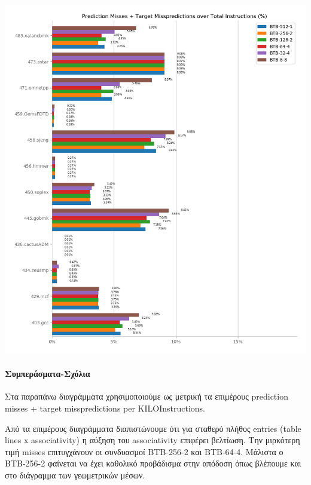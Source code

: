    \begin{minipage}{\textwidth}
      \begin{center}
         \\
         \vspace{3mm}
         \includegraphics[width=\textwidth, frame]{./graphs/4-3/bar_chart.png}
         \vspace{6mm}
      \end{center}
   \end{minipage}

\paragraph{Συμπεράσματα-Σχόλια}
   Στα παραπάνω διαγράμματα χρησιμοποιούμε ως μετρική τα επιμέρους prediction misses +
   target misspredictions per KILOInstructions.

   Από τα επιμέρους διαγράμματα διαπιστώνουμε ότι για σταθερό πλήθος entries
   (table lines x associativity) η αύξηση του associativity επιφέρει βελτίωση.
   Την μιρκότερη τιμή misses επιτυγχάνουν οι συνδυασμοί BTB-256-2 και BTB-64-4.
   Μάλιστα ο BTB-256-2 φαίνεται να έχει καθολικό προβάδισμα στην απόδοση όπως
   βλέπουμε και στο διάγραμμα των γεωμετρικών μέσων. 


